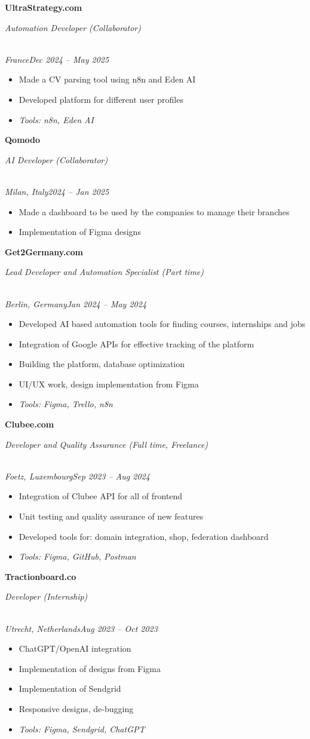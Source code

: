 \documentclass[a4paper,10pt]{article}
\newcommand{\role}[4]{\vspace{3pt}\noindent\hspace{0.6em}\parbox[t]{0.38\textwidth}{\raggedright\textbf{#1}}\hfill\parbox[t]{0.58\textwidth}{\raggedleft\textit{#2}}\\{\textit{#3}\hfill\textit{#4}}\vspace{1pt}}
\begin{document}
\role{UltraStrategy.com}{Automation Developer (Collaborator)}{France}{Dec 2024 -- May 2025}
\begin{itemize}
\item Made a CV parsing tool using n8n and Eden AI
\item Developed platform for different user profiles
\item \textit{Tools: n8n, Eden AI}
\end{itemize}

\role{Qomodo}{AI Developer (Collaborator)}{Milan, Italy}{2024 -- Jan 2025}
\begin{itemize}
\item Made a dashboard to be used by the companies to manage their branches
\item Implementation of Figma designs
\end{itemize}

\role{Get2Germany.com}{Lead Developer and Automation Specialist (Part time)}{Berlin, Germany}{Jan 2024 -- May 2024}
\begin{itemize}
\item Developed AI based automation tools for finding courses, internships and jobs
\item Integration of Google APIs for effective tracking of the platform
\item Building the platform, database optimization
\item UI/UX work, design implementation from Figma
\item \textit{Tools: Figma, Trello, n8n}
\end{itemize}

\role{Clubee.com}{Developer and Quality Assurance (Full time, Freelance)}{Foetz, Luxembourg}{Sep 2023 -- Aug 2024}
\begin{itemize}
\item Integration of Clubee API for all of frontend
\item Unit testing and quality assurance of new features
\item Developed tools for: domain integration, shop, federation dashboard
\item \textit{Tools: Figma, GitHub, Postman}
\end{itemize}

\role{Tractionboard.co}{Developer (Internship)}{Utrecht, Netherlands}{Aug 2023 -- Oct 2023}
\begin{itemize}
\item ChatGPT/OpenAI integration
\item Implementation of designs from Figma
\item Implementation of Sendgrid
\item Responsive designs, de-bugging
\item \textit{Tools: Figma, Sendgrid, ChatGPT}
\end{itemize}
\end{document}

